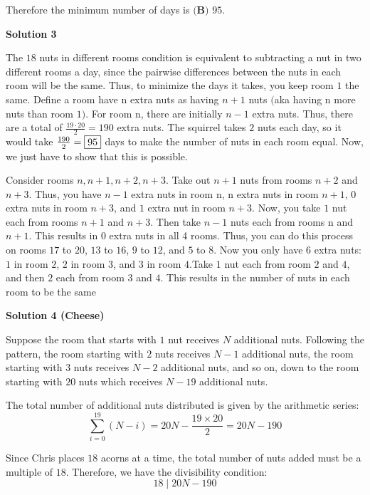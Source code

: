 \begin{enumerate}
 Therefore the minimum number of days is $\boxed{\textbf{(B) }95}$.

 



\textbf{Solution 3}

The $18$ nuts in different rooms condition is equivalent to subtracting a nut in two different rooms a day, since the pairwise differences between the nuts in each room will be the same. Thus, to minimize the days it takes, you keep room $1$ the same. Define a room have n extra nuts as having $n+1$ nuts $($aka having n more nuts than room $1)$. For room n, there are initially $n-1$ extra nuts. Thus, there are a total of $\frac{19\cdot 20}{2}=190$ extra nuts. The squirrel takes $2$ nuts each day, so it would take $\frac{190}{2}=\fbox{95}$ days to make the number of nuts in each room equal. Now, we just have to show that this is possible. 

 Consider rooms $n, n+1, n+2, n+3$. Take out $n+1$ nuts from rooms $n+2$ and $n+3$. Thus, you have $n-1$ extra nuts in room n, n extra nuts in room $n+1$, $0$ extra nuts in room $n+3$, and $1$ extra nut in room $n+3$. Now, you take $1$ nut each from rooms $n+1$ and $n+3$. Then take $n-1$ nuts each from rooms n and $n+1$. This results in $0$ extra nuts in all 4 rooms. Thus, you can do this process on rooms $17$ to $20$, $13$ to $16$, $9$ to $12$, and $5$ to $8$. Now you only have $6$ extra nuts: $1$ in room $2$, $2$ in room $3$, and $3$ in room $4$.Take $1$ nut each from room $2$ and $4$, and then $2$ each from room $3$ and $4$. This results in the number of nuts in each room to be the same

 



\textbf{Solution 4 (Cheese)}

Suppose the room that starts with $1$ nut receives $N$ additional nuts. Following the pattern, the room starting with $2$ nuts receives $N - 1$ additional nuts, the room starting with $3$ nuts receives $N - 2$ additional nuts, and so on, down to the room starting with $20$ nuts which receives $N - 19$ additional nuts.

 The total number of additional nuts distributed is given by the arithmetic series:
 \[\sum_{i=0}^{19} (N - i) = 20N - \frac{19 \times 20}{2} = 20N - 190\]

 Since Chris places $18$ acorns at a time, the total number of nuts added must be a multiple of $18$. Therefore, we have the divisibility condition:
 \[18 \mid 20N - 190\]


\end{enumerate}
